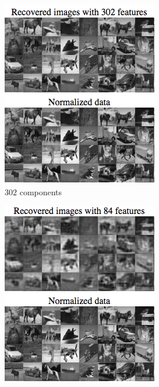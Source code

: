 \documentclass{article} %
\begin{document}
\begin{figure}[h]
\centering
\begin{subfigure}{.5\textwidth}
  \centering
  \includegraphics[width=.9\linewidth]{CIFAR10All1024RecoveredNormalized}
  \caption{$302$ components}
  \label{fig:cifarall302}
\end{subfigure}%
\begin{subfigure}{.5\textwidth}
  \centering
  \includegraphics[width=.9\linewidth]{CIFAR10All1024RecoveredNormalized84}

\end{subfigure}
\end{figure}
\end{document}
